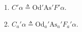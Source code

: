 \begin{enumerate}
\item $C' \alpha \triangleq \mathrm{Od}' \mathrm{As}' F' \alpha$.
\item $C_a' \alpha \triangleq \mathrm{Od}_a' \mathrm{As}_a' F_a' \alpha$.
\end{enumerate}
